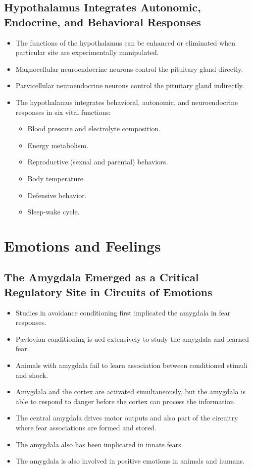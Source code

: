 \documentclass[12pt,a4paper]{article}
\begin{document}
\subsection{Hypothalamus Integrates Autonomic, Endocrine, and Behavioral Responses}
\begin{itemize}
    \item The functions of the hypothalamus can be enhanced or eliminated when particular site are experimentally manipulated.
    \item Magnocellular neuroendocrine neurons control the pituitary gland directly.
    \item Parvicellular neuroendocrine neurons control the pituitary gland indirectly.
    \item The hypothalamus integrates behavioral, autonomic, and neuroendocrine responses in six vital functions:
        \begin{itemize}
            \item Blood pressure and electrolyte composition.
            \item Energy metabolism.
            \item Reproductive (sexual and parental) behaviors.
            \item Body temperature.
            \item Defensive behavior.
            \item Sleep-wake cycle.
        \end{itemize}
\end{itemize}


\clearpage
\section{Emotions and Feelings}
\subsection{The Amygdala Emerged as a Critical Regulatory Site in Circuits of Emotions}
\begin{itemize}
    \item Studies in avoidance conditioning first implicated the amygdala in fear responses.
    \item Pavlovian conditioning is ued extensively to study the amygdala and learned fear.
    \item Animals with amygdala fail to learn association between conditioned stimuli and shock.
    \item Amygdala and the cortex are activated simultaneously, but the amygdala is able to respond to danger before the cortex can process the information.
    \item The central amygdala drives motor outputs and also part of the circuitry where fear associations are formed and stored.
    \item The amygdala also has been implicated in innate fears.
    \item The amygdala is also involved in positive emotions in animals and humans.
\end{itemize}
\end{document}
